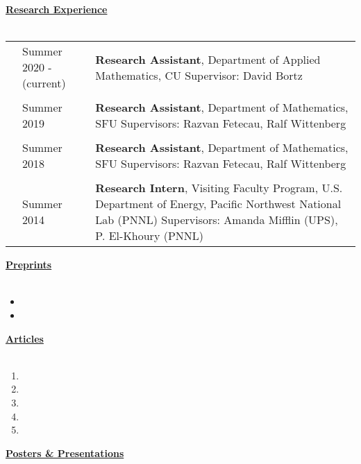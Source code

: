 \documentclass[letterpaper,11pt,oneside]{article}
\newcommand{\headr}[1]{\vspace{10pt}\uline{\Large{\textbf{#1}} \hfill } \\ \vspace{-10pt}\\}
\begin{document}
\headr{Research Experience}

\begin{tabular}{@{} p{0.01cm} p{4cm} p{12cm}}
& Summer 2020 - \newline(current)  & 
\textbf{Research Assistant}, Department of Applied Mathematics, CU \newline
Supervisor: David Bortz \\
&     & \\
& Summer 2019  & 
\textbf{Research Assistant}, Department of Mathematics, SFU
\newline Supervisors: Razvan Fetecau, Ralf Wittenberg \\
&     & \\
& Summer 2018  & 
\textbf{Research Assistant}, Department of Mathematics, SFU
\newline Supervisors: Razvan Fetecau, Ralf Wittenberg \\
&     & \\
& Summer 2014  & 
\textbf{Research Intern},  Visiting Faculty Program, U.S. Department of Energy, Pacific Northwest National Lab (PNNL)
\newline Supervisors: Amanda Mifflin (UPS), P. El-Khoury (PNNL) 
\end{tabular}




\headr{Preprints}

\begin{itemize}
\item {}
\item {}
\end{itemize}
\newpage
\headr{Articles}

\begin{enumerate}
\item {}
\item {}
\item {}
\item {}
\item {}
\end{enumerate}


%

\headr{Posters \& Presentations}
\end{document}
